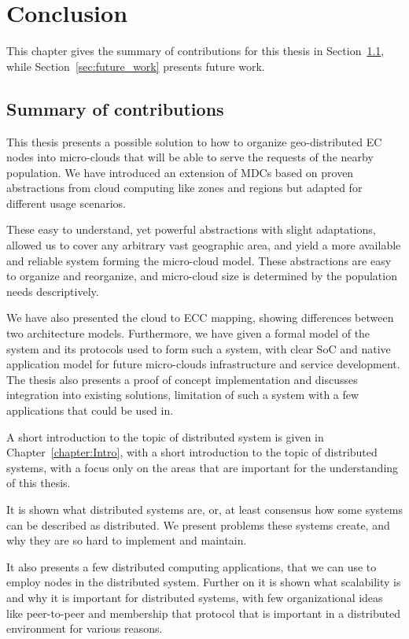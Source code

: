 \chapter{Conclusion}\label{chapter:Conclusion}
%
This chapter gives the summary of contributions for this thesis in Section~\ref{sec:summary_of_contributions}, while Section~\ref{sec:future_work} presents future work.
%
%
\section{Summary of contributions}\label{sec:summary_of_contributions}
%
This thesis presents a possible solution to how to organize geo-distributed EC nodes into micro-clouds that will be able to serve the requests of the nearby population. We have introduced an extension of MDCs based on proven abstractions from cloud computing like zones and regions but adapted for different usage scenarios.

These easy to understand, yet powerful abstractions with slight adaptations, allowed us to cover any arbitrary vast geographic area, and yield a more available and reliable system forming the micro-cloud model. These abstractions are easy to organize and reorganize, and micro-cloud size is determined by the population needs descriptively. 

We have also presented the cloud to ECC mapping, showing differences between two architecture models. Furthermore, we have given a formal model of the system and its protocols used to form such a system, with clear SoC and native application model for future micro-clouds infrastructure and service development. The thesis also presents a proof of concept implementation and discusses integration into existing solutions, limitation of such a system with a few applications that could be used in.

A short introduction to the topic of distributed system is given in Chapter~\ref{chapter:Intro}, with a short introduction to the topic of distributed systems, with a focus only on the areas that are important for the understanding of this thesis. 

It is shown what distributed systems are, or, at least consensus how some systems can be described as distributed. We present problems these systems create, and why they are so hard to implement and maintain. 

It also presents a few distributed computing applications, that we can use to employ nodes in the distributed system. Further on it is shown what scalability is and why it is important for distributed systems, with few organizational ideas like peer-to-peer and membership that protocol that is important in a distributed environment for various reasons.

